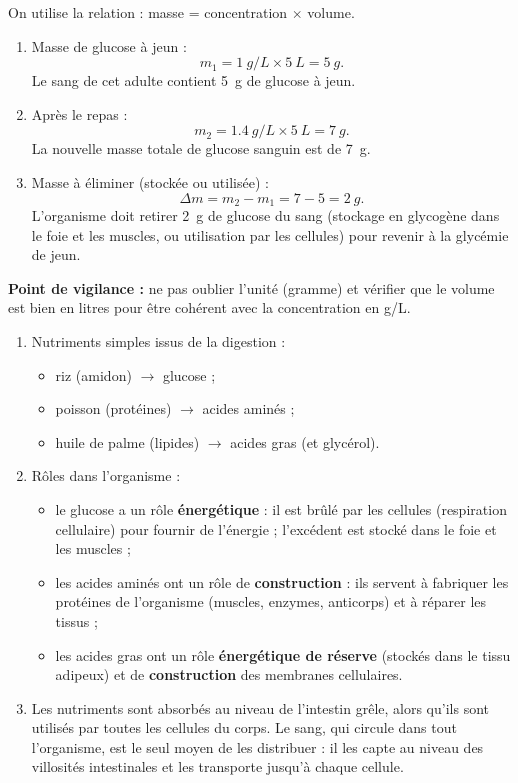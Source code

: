 \documentclass[11pt]{article}
\newcommand{\cle}[1]{{\popxbold\color{popdark}#1}}
\begin{document}
\begin{corrige}
On utilise la relation : masse = concentration $\times$ volume.
\begin{enumerate}
\item Masse de glucose à jeun :
\[ m_1 = \SI{1}{g/L} \times \SI{5}{L} = \SI{5}{g}. \]
Le sang de cet adulte contient \SI{5}{g} de glucose à jeun.
\item Après le repas :
\[ m_2 = \SI{1,4}{g/L} \times \SI{5}{L} = \SI{7}{g}. \]
La nouvelle masse totale de glucose sanguin est de \SI{7}{g}.
\item Masse à éliminer (stockée ou utilisée) :
\[ \Delta m = m_2 - m_1 = 7 - 5 = \SI{2}{g}. \]
L'organisme doit retirer \SI{2}{g} de glucose du sang (stockage en glycogène dans le foie et les muscles, ou utilisation par les cellules) pour revenir à la glycémie de jeun.
\end{enumerate}
\textbf{Point de vigilance :} ne pas oublier l'unité (gramme) et vérifier que le volume est bien en litres pour être cohérent avec la concentration en g/L.
\end{corrige}

\begin{corrige}
\begin{enumerate}
\item Nutriments simples issus de la digestion :
\begin{itemize}
\item riz (amidon) $\rightarrow$ \cle{glucose} ;
\item poisson (protéines) $\rightarrow$ \cle{acides aminés} ;
\item huile de palme (lipides) $\rightarrow$ \cle{acides gras} (et glycérol).
\end{itemize}
\item Rôles dans l'organisme :
\begin{itemize}
\item le glucose a un rôle \textbf{énergétique} : il est brûlé par les cellules (respiration cellulaire) pour fournir de l'énergie ; l'excédent est stocké dans le foie et les muscles ;
\item les acides aminés ont un rôle de \textbf{construction} : ils servent à fabriquer les protéines de l'organisme (muscles, enzymes, anticorps) et à réparer les tissus ;
\item les acides gras ont un rôle \textbf{énergétique de réserve} (stockés dans le tissu adipeux) et de \textbf{construction} des membranes cellulaires.
\end{itemize}
\item Les nutriments sont absorbés au niveau de l'intestin grêle, alors qu'ils sont utilisés par toutes les cellules du corps. Le sang, qui circule dans tout l'organisme, est le seul moyen de les distribuer : il les capte au niveau des villosités intestinales et les transporte jusqu'à chaque cellule.
\end{enumerate}
\end{corrige}
\end{document}
